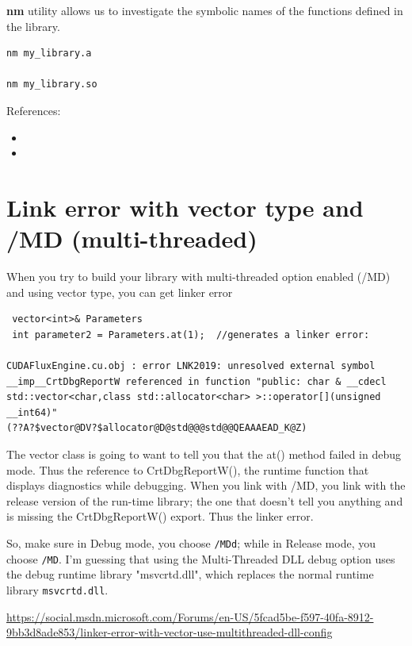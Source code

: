 {\bf nm} utility allows us to investigate the symbolic names of the
functions defined in the library.
\begin{lstlisting}
nm my_library.a

nm my_library.so
\end{lstlisting}

References:
\begin{itemize}
\item {}
\item  {}
\end{itemize}


\section{Link error with vector type and /MD (multi-threaded)}

When you try to build your library with multi-threaded option enabled (/MD) and
using vector type, you can get  linker error 
\begin{verbatim}
 vector<int>& Parameters
 int parameter2 = Parameters.at(1);  //generates a linker error:

CUDAFluxEngine.cu.obj : error LNK2019: unresolved external symbol
__imp__CrtDbgReportW referenced in function "public: char & __cdecl
std::vector<char,class std::allocator<char> >::operator[](unsigned __int64)"
(??A?$vector@DV?$allocator@D@std@@@std@@QEAAAEAD_K@Z)  
\end{verbatim}

The vector class is going to want to tell you that the at() method failed in
debug mode.  Thus the reference to CrtDbgReportW(), the runtime function that
displays diagnostics while debugging.  When you link with /MD, you link with the
release version of the run-time library; the one that doesn't tell you anything
and is missing the CrtDbgReportW() export.  Thus the linker error.    

So, make sure in Debug mode, you choose \verb!/MDd!; while in Release mode, you
choose \verb!/MD!. I'm guessing that using the Multi-Threaded DLL
debug option uses the debug runtime library "msvcrtd.dll", which replaces the
normal runtime library \verb!msvcrtd.dll!.

\url{https://social.msdn.microsoft.com/Forums/en-US/5fcad5be-f597-40fa-8912-9bb3d8ade853/linker-error-with-vector-use-multithreaded-dll-config}




